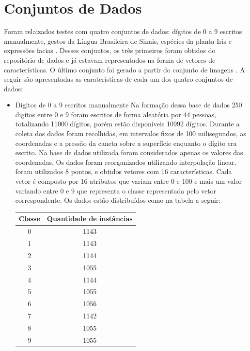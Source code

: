 \section{Conjuntos de Dados}
Foram relaizados testes com quatro conjuntos de dados: dígitos de 0 a 9 escritos manualmente, gestos da Língua Brasileira de Sinais, espécies da planta Iris e expressões facias . Desses conjuntos, os três primeiros foram obtidos do repositório de dados  e já estavam representados na forma de vetores de características. O último conjunto foi gerado a partir do conjunto de imagens . A seguir são apresentadas as caraterísticas de cada um dos quatro conjuntos de dados:

\begin{itemize}
\item{Dígitos de 0 a 9 escritos manualmente \cite{Digitos}}
Na formação dessa base de dados 250 digítos entre 0 e 9 foram escritos de forma aleatória por 44 pessoas, totalizando 11000 dígitos, porém estão disponíveis 10992 dígitos. Durante a coleta dos dados foram recolhidas, em intervalos fixos de 100 milisegundos, as coordenadas e a pressão da caneta sobre a superfície enquanto o dígito era escrito. Na base de dados utilizada foram considerados apenas os valores das coordenadas. Os dados foram reorganizados utilizando interpolação linear, foram utilizados 8 pontos, e obtidos vetores com 16 características.
Cada vetor é composto por 16 atributos que variam entre 0 e 100 e mais um valor variando entre 0 e 9 que representa o classe representada pelo vetor correspondente.
Os dados estão distribuídos como na tabela a seguir:
\begin{center}
	\begin{tabular}{cc}
        \hline
        Classe & Quantidade de instâncias \\
        \hline
		0 & 1143 \\
		1 & 1143 \\
		2 & 1144 \\
		3 & 1055 \\
		4 & 1144 \\
		5 & 1055 \\
		6 & 1056 \\
		7 & 1142 \\
		8 & 1055 \\
		9 & 1055 \\
        \hline
	\end{tabular}
	\label{tab:tabela_digitos}
\end{center}


\end{itemize}
